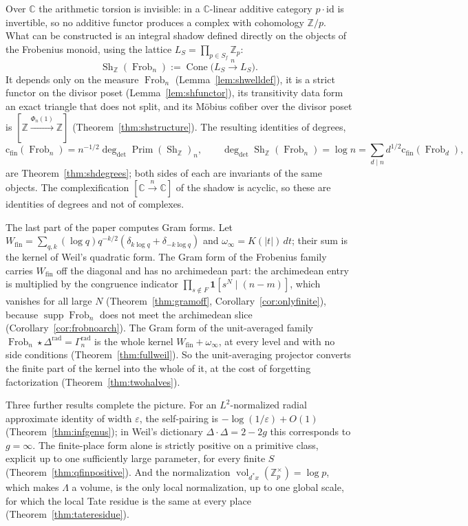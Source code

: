 \documentclass[11pt]{amsart}
\theoremstyle{definition}
\theoremstyle{remark}
\newcommand{\C}{\mathbb C}
\newcommand{\Z}{\mathbb Z}
\newcommand{\Frob}{\operatorname{Frob}}
\newcommand{\Sh}{\operatorname{Sh}}
\newcommand{\Prim}{\operatorname{Prim}}
\newcommand{\supp}{\operatorname{supp}}
\newcommand{\vol}{\operatorname{vol}}
\newcommand{\Cone}{\operatorname{Cone}}
\newcommand{\degdet}{\operatorname{deg}_{\mathrm{det}}}
\newcommand{\cfin}{\mathrm{c}_{\mathrm{fin}}}
\begin{document}
Over $\C$ the arithmetic torsion is invisible: in a $\C$-linear additive
category $p\cdot\mathrm{id}$ is invertible, so no additive functor produces a
complex with cohomology $\Z/p$.  What can be constructed is an integral shadow
defined directly on the objects of the Frobenius monoid, using the lattice
$L_S=\prod_{p\in S_f}\Z_p$:
\[
  \Sh_\Z(\Frob_n):=\Cone\bigl(L_S\xrightarrow{\ n\ }L_S\bigr).
\]
It depends only on the measure $\Frob_n$ (Lemma~\ref{lem:shwelldef}), it is a
strict functor on the divisor poset (Lemma~\ref{lem:shfunctor}), its
transitivity data form an exact triangle that does not split, and its
M\"obius cofiber over the divisor poset is $[\Z\xrightarrow{\Phi_n(1)}\Z]$
(Theorem~\ref{thm:shstructure}).  The resulting identities of degrees,
\[
  \cfin(\Frob_n)=n^{-1/2}\degdet\Prim(\Sh_\Z)_n,\qquad
  \degdet\Sh_\Z(\Frob_n)=\log n=\sum_{d\mid n}d^{1/2}\cfin(\Frob_d),
\]
are Theorem~\ref{thm:shdegrees}; both sides of each are invariants of the same
objects.  The complexification $[\C\xrightarrow{n}\C]$ of the shadow is
acyclic, so these are identities of degrees and not of complexes.

The last part of the paper computes Gram forms.  Let
$W_{\mathrm{fin}}=\sum_{q,k}(\log q)q^{-k/2}(\delta_{k\log q}+\delta_{-k\log
q})$ and $\omega_\infty=K(|t|)\,dt$; their sum is the kernel of Weil's
quadratic form.  The Gram form of the Frobenius family carries
$W_{\mathrm{fin}}$ off the diagonal and has no archimedean part: the
archimedean entry is multiplied by the congruence indicator
$\prod_{s\notin F}\mathbf 1[s^N\mid (n-m)]$, which vanishes for all large $N$
(Theorem~\ref{thm:gramoff}, Corollary~\ref{cor:onlyfinite}), because
$\supp\Frob_n$ does not meet the archimedean slice
(Corollary~\ref{cor:frobnoarch}).  The Gram form of the unit-averaged family
$\Frob_n\star\Delta^{\mathrm{rad}}=\Gamma_n^{\mathrm{rad}}$ is the whole kernel
$W_{\mathrm{fin}}+\omega_\infty$, at every level and with no side conditions
(Theorem~\ref{thm:fullweil}).  So the unit-averaging projector converts the
finite part of the kernel into the whole of it, at the cost of forgetting
factorization (Theorem~\ref{thm:twohalves}).

Three further results complete the picture.  For an $L^2$-normalized radial
approximate identity of width $\varepsilon$, the self-pairing is
$-\log(1/\varepsilon)+O(1)$ (Theorem~\ref{thm:infgenus}); in Weil's dictionary
$\Delta\cdot\Delta=2-2g$ this corresponds to $g=\infty$.  The finite-place
form alone is strictly positive on a primitive class, explicit up to one
sufficiently large parameter, for every finite
$S$ (Theorem~\ref{thm:qfinpositive}).  And the normalization
$\vol_{d^*x}(\Z_p^\times)=\log p$, which makes $\Lambda$ a volume, is the only
local normalization, up to one global scale, for which the local Tate residue
is the same at every place (Theorem~\ref{thm:tateresidue}).
\end{document}
